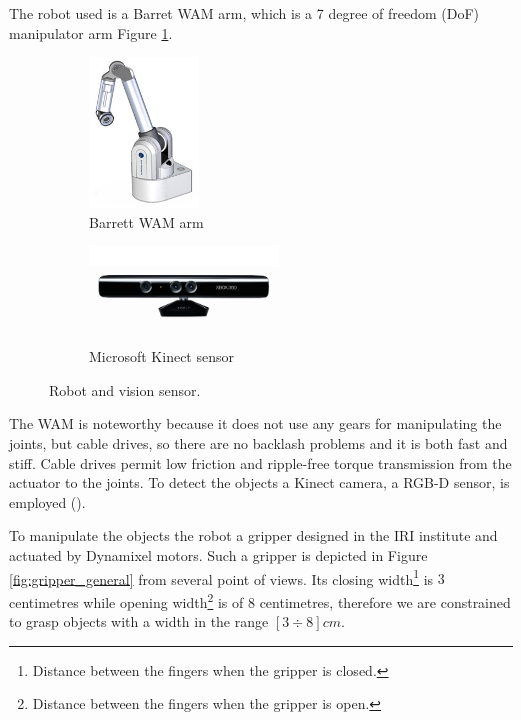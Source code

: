 The robot used is a Barret WAM arm, which is a 7 degree of freedom (DoF) manipulator arm Figure \ref{fig:wam_1}\DM{)}. 
\begin{figure}[htp]
\centering
\begin{subfigure}[b]{0.45\textwidth}
\centering
\includegraphics[height=4cm]{Img/set_up/wam.jpg}
\caption{Barrett WAM arm}\label{fig:wam_1}
\end{subfigure}
\begin{subfigure}[b]{0.45\textwidth}
\centering
\includegraphics[width=5cm]{Img/set_up/Kinect.jpg}
\caption{Microsoft Kinect sensor}\label{fig:kinect}
\end{subfigure}
\caption{Robot and vision sensor.}
\end{figure}
The WAM is noteworthy because it does not use any gears for manipulating the joints, but cable drives, so there are no backlash problems and it is both fast and stiff. Cable drives permit low friction and ripple-free torque transmission from the actuator to the joints. 
To detect the objects a Kinect camera, a RGB-D sensor, is employed ().

To manipulate the objects  the robot  a gripper designed in the IRI institute and actuated by Dynamixel motors. Such a gripper is depicted in Figure \ref{fig:gripper_general} from several point of views. Its closing width\footnote{Distance between the fingers when the gripper is closed.} is $3$ centimetres while  opening width\footnote{Distance between the fingers when the gripper is open.} is of $8$ centimetres, therefore we are constrained to grasp objects with a width in the range $[3 \div 8]cm$.

